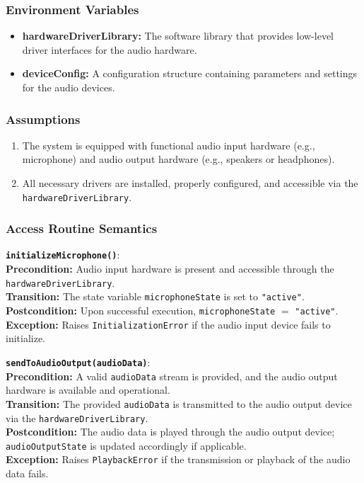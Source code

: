 \documentclass[12pt, titlepage]{article}
\begin{document}
\subsubsection{Environment Variables}
\begin{itemize}
    \item \textbf{hardwareDriverLibrary:} The software library that provides low-level driver interfaces for the audio hardware.
    \item \textbf{deviceConfig:} A configuration structure containing parameters and settings for the audio devices.
\end{itemize}

\subsubsection{Assumptions}
\begin{enumerate}
    \item The system is equipped with functional audio input hardware (e.g., microphone) and audio output hardware (e.g., speakers or headphones).
    \item All necessary drivers are installed, properly configured, and accessible via the \texttt{hardwareDriverLibrary}.
\end{enumerate}

\subsubsection{Access Routine Semantics}

\textbf{\texttt{initializeMicrophone()}}: \\
\textbf{Precondition:} Audio input hardware is present and accessible through the \texttt{hardwareDriverLibrary}. \\
\textbf{Transition:} The state variable \texttt{microphoneState} is set to \texttt{"active"}. \\
\textbf{Postcondition:} Upon successful execution, \texttt{microphoneState} $=$ \texttt{"active"}. \\
\textbf{Exception:} Raises \texttt{InitializationError} if the audio input device fails to initialize.

\vspace{2mm}
\noindent \textbf{\texttt{sendToAudioOutput(audioData)}}: \\
\textbf{Precondition:} A valid \texttt{audioData} stream is provided, and the audio output hardware is available and operational. \\
\textbf{Transition:} The provided \texttt{audioData} is transmitted to the audio output device via the \texttt{hardwareDriverLibrary}. \\
\textbf{Postcondition:} The audio data is played through the audio output device; \texttt{audioOutputState} is updated accordingly if applicable. \\
\textbf{Exception:} Raises \texttt{PlaybackError} if the transmission or playback of the audio data fails.
\end{document}
